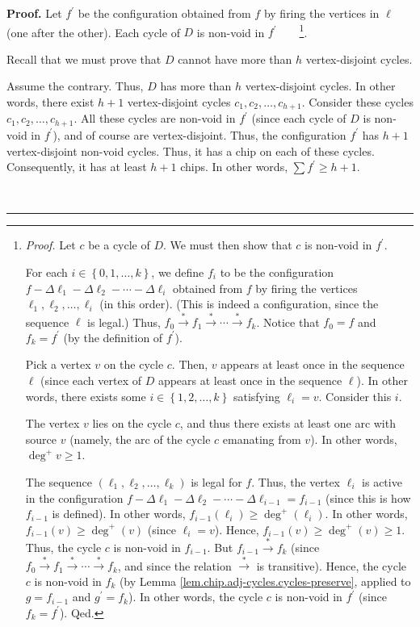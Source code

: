 \documentclass[numbers=enddot,12pt,final,onecolumn,notitlepage]{scrartcl}%
\theoremstyle{definition}
\newenvironment{proof}[1][Proof]{\noindent\textbf{#1.} }{\ \rule{0.5em}{0.5em}}
\let\sumnonlimits\sum
\renewcommand{\sum}{\sumnonlimits\limits}
\newcommand{\tup}[1]{\left( #1 \right)}
\begin{document}
\begin{proof}
Let $f^{\prime}$ be the configuration obtained from $f$ by firing the vertices
in $\ell$ (one after the other). Each cycle of $D$ is non-void in $f^{\prime}%
$\ \ \ \ \footnote{\textit{Proof.} Let $c$ be a cycle of $D$. We must then
show that $c$ is non-void in $f^{\prime}$.
\par
For each $i\in\left\{  0,1,\ldots,k\right\}  $, we define $f_{i}$ to be the
configuration
$f - \Delta \ell_1 - \Delta \ell_2 - \cdots - \Delta \ell_i$
obtained from $f$ by firing the vertices $\ell_{1},\ell
_{2},\ldots,\ell_{i}$ (in this order). (This is indeed a configuration, since
the sequence $\ell$ is legal.) Thus, $f_{0}\overset{\ast}{\rightarrow}%
f_{1}\overset{\ast}{\rightarrow}\cdots\overset{\ast}{\rightarrow}f_{k}$.
Notice that $f_{0}=f$ and $f_{k}=f^{\prime}$ (by the definition of $f^{\prime
}$).
\par
Pick a vertex $v$ on the cycle $c$. Then, $v$ appears at least once in the
sequence $\ell$ (since each vertex of $D$ appears at least once in the
sequence $\ell$). In other words, there exists some $i\in\left\{
1,2,\ldots,k\right\}  $ satisfying $\ell_{i}=v$. Consider this $i$.
\par
The vertex $v$ lies on the cycle $c$, and thus there exists at
least one arc with source $v$ (namely, the arc of the cycle $c$
emanating from $v$). In other words, $\deg^+ v \geq 1$.
\par
The
sequence $\left( \ell_1, \ell_2, \ldots, \ell_k \right)$ is legal for $f$.
Thus,
the vertex $\ell_{i}$ is active in the configuration
$f - \Delta \ell_1 - \Delta \ell_2 - \cdots - \Delta \ell_{i-1}
= f_{i-1}$ (since this is how $f_{i-1}$ is defined).
In other words, $f_{i-1}\left(  \ell_{i}\right)  \geq
\deg^+\left(  \ell_{i}\right)$.
In other words, $f_{i-1}\left(  v\right) \geq \deg^+ \tup{v}$
(since $\ell_{i}=v$). Hence, $f_{i-1} \tup{v} \geq \deg^+ \tup{v}
\geq 1$.
Thus, the cycle $c$ is non-void in $f_{i-1}$. But
$f_{i-1}\overset{\ast}{\rightarrow}f_{k}$ (since $f_{0}\overset{\ast
}{\rightarrow}f_{1}\overset{\ast}{\rightarrow}\cdots\overset{\ast
}{\rightarrow}f_{k}$, and since the relation $\overset{\ast}{\rightarrow}$ is
transitive). Hence, the cycle $c$ is non-void in $f_{k}$ (by Lemma
\ref{lem.chip.adj-cycles.cycles-preserve}, applied to $g=f_{i-1}$ and
$g^{\prime}=f_{k}$). In other words, the cycle $c$ is non-void in $f^{\prime}$
(since $f_{k}=f^{\prime}$). Qed.}.

Recall that we must prove that $D$ cannot have more than $h$
vertex-disjoint cycles.

Assume the contrary. Thus, $D$ has more than $h$ vertex-disjoint cycles. In
other words, there exist $h+1$ vertex-disjoint cycles $c_{1},c_{2}%
,\ldots,c_{h+1}$. Consider these cycles $c_{1},c_{2},\ldots,c_{h+1}$. All
these cycles are non-void in $f^{\prime}$ (since each cycle of $D$ is non-void
in $f^{\prime}$), and of course are vertex-disjoint. Thus, the configuration
$f^{\prime}$ has $h+1$ vertex-disjoint non-void cycles. Thus, it has a chip on
each of these cycles. Consequently, it has at least $h+1$ chips. In other
words, $\sum f^{\prime}\geq h+1$.


\end{proof}
\end{document}
